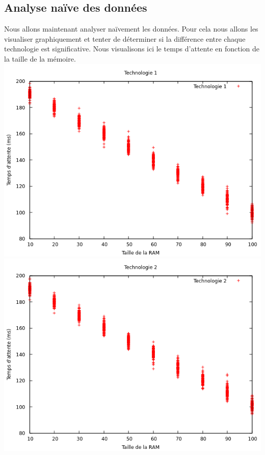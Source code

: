 \documentclass[a4paper,10pt]{article}
\begin{document}
\subsection{Analyse naïve des données}

Nous allons maintenant analyser naïvement les données. Pour cela nous allons les visualiser graphiquement et tenter de déterminer si la différence entre chaque
technologie est significative. Nous visualisons ici le temps d'attente en fonction de la taille de la mémoire.
\\
\includegraphics[scale=0.6]{img/techno1_plot.png}
\\
\includegraphics[scale=0.6]{img/techno2_plot.png}
\\
\end{document}
